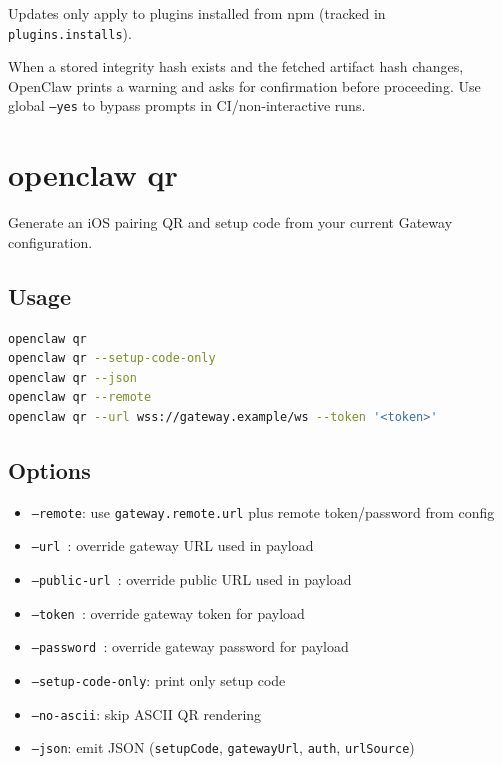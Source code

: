 Updates only apply to plugins installed from npm (tracked in \texttt{plugins.installs}).

When a stored integrity hash exists and the fetched artifact hash changes,
OpenClaw prints a warning and asks for confirmation before proceeding. Use
global \texttt{--yes} to bypass prompts in CI/non-interactive runs.


\clearpage

\section{openclaw qr}


Generate an iOS pairing QR and setup code from your current Gateway configuration.

\subsection{Usage}


\begin{lstlisting}[language=bash]
openclaw qr
openclaw qr --setup-code-only
openclaw qr --json
openclaw qr --remote
openclaw qr --url wss://gateway.example/ws --token '<token>'
\end{lstlisting}


\subsection{Options}


\begin{itemize}
  \item \texttt{--remote}: use \texttt{gateway.remote.url} plus remote token/password from config
  \item \texttt{--url }: override gateway URL used in payload
  \item \texttt{--public-url }: override public URL used in payload
  \item \texttt{--token }: override gateway token for payload
  \item \texttt{--password }: override gateway password for payload
  \item \texttt{--setup-code-only}: print only setup code
  \item \texttt{--no-ascii}: skip ASCII QR rendering
  \item \texttt{--json}: emit JSON (\texttt{setupCode}, \texttt{gatewayUrl}, \texttt{auth}, \texttt{urlSource})
\end{itemize}


